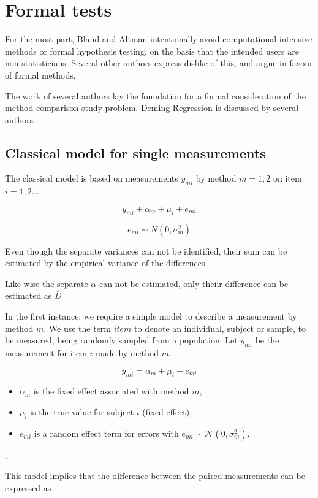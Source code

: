 \documentclass[12pt, a4paper]{report}
\theoremstyle{plain}
\theoremstyle{definition}
\theoremstyle{remark}
\begin{document}
\chapter{Formal tests}
For the most part, Bland and Altman intentionally avoid computational intensive methods or formal hypothesis testing, on the basis
that the intended users are non-statisticians. Several other authors express dislike of this, and argue in favour of
formal methods.

The work of several authors lay the foundation for a formal consideration of the method comparison study problem.
Deming Regression is discussed by several authors.



	\section{Classical model for single measurements}
	The classical model is based on measurements $y_{mi}$
	by method $m=1,2$ on item $i = 1,2 \ldots$
	
	\[y_{mi} + \alpha_{m} + \mu_{i} + e_{mi}\]
	
	\[e_{mi} \sim N(0,\sigma^2_m)\]
	
	Even though the separate variances can not be
	identified, their sum can be estimated by the empirical variance of the differences.
	
	Like wise the separate $\alpha$ can not be
	estimated, only theiir difference can be estimated as
	$\bar{D}$
	
	
	In the first instance, we require a simple model to describe a measurement by method $m$. We use the term $item$ to denote an individual, subject or sample, to be measured, being randomly sampled from a population. Let $y_{mi}$ be the measurement for item $i$ made by method $m$.
	
	\[ y_{mi} = \alpha_{m} + \mu_{i} + e_{mi}  \]
	
	\begin{itemize}
		\item $\alpha_m$ is the fixed effect associated with method $m$,
		\item $\mu_i$ is the true value for subject $i$ (fixed effect),
		\item $e_{mi}$ is a
		random effect term for errors with $e_{mi}  \sim \mathcal{N}(0,\sigma^2_m)$. \end{itemize}.
	
	This model implies that the difference between the paired measurements can be expressed as
	
\end{document}
